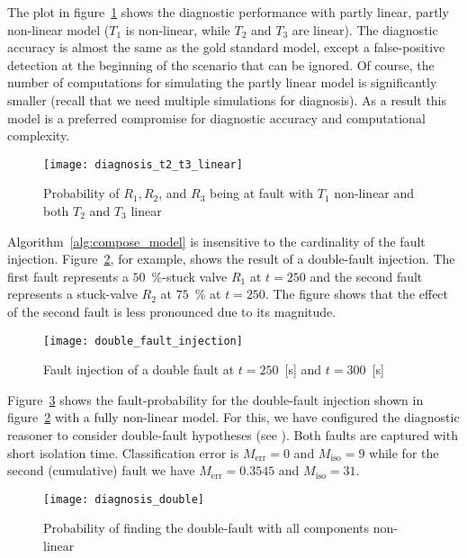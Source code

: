 \par
%
The plot in figure~\ref{fig:diagnosis_t2_t3_linear} shows the
diagnostic performance with partly linear, partly non-linear model
($T_1$ is non-linear, while $T_2$ and $T_3$ are linear). The
diagnostic accuracy is almost the same as the gold standard model, except a false-positive
detection at the beginning of the scenario that can be ignored. Of
course, the number of computations for simulating the partly linear
model is significantly smaller (recall that we need multiple
simulations for diagnosis). As a result this model is a preferred
compromise for diagnostic accuracy and computational complexity.
%
\begin{figure}[htb]
  \centering
  \texttt{[image: diagnosis\_t2\_t3\_linear]}
  \caption{Probability of $R_1, R_2$, and $R_3$ being at fault with $T_1$ non-linear and both $T_2$ and $T_3$ linear}
  \label{fig:diagnosis_t2_t3_linear}
\end{figure}
\par
%
Algorithm~\ref{alg:compose_model} is insensitive to the cardinality of
the fault injection. Figure~\ref{fig:double_fault_injection}, for
example, shows the result of a double-fault injection. The first fault
represents a $50$~\%-stuck valve $R_1$ at $t = 250$ and the second
fault represents a stuck-valve $R_2$ at $75$~\% at $t = 250$. The figure shows that
the effect of the second fault is less pronounced due to its
magnitude.
%
\begin{figure}[htb]
  \centering
  \texttt{[image: double\_fault\_injection]}
  \caption{Fault injection of a double fault at $t = 250$~[s] and $t = 300$~[s]}
  \label{fig:double_fault_injection}
\end{figure}
\par
Figure~\ref{fig:diagnosis_double} shows the fault-probability for the
double-fault injection shown in
figure~\ref{fig:double_fault_injection} with a fully non-linear
model. For this, we have configured the diagnostic reasoner to
consider double-fault hypotheses (see \cite{feldman13genius}). Both
faults are captured with short isolation time.
Classification error is $M_{\mathrm{err}} = 0$ and
$M_{\mathrm{iso}} = 9$ while for the second (cumulative) fault we have
$M_{\mathrm{err}} = 0.3545$ and $M_{\mathrm{iso}} = 31$.
%
\begin{figure}[htb]
  \centering
  \texttt{[image: diagnosis\_double]}
  \caption{Probability of finding the double-fault with all components non-linear}
  \label{fig:diagnosis_double}
\end{figure}
